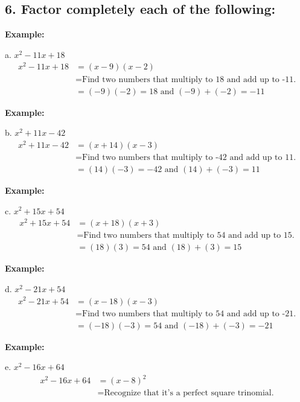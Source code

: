 \documentclass[12pt,a4paper]{article}
\newenvironment{example}
  {\begin{framed}\colorbox{examplecolor}{
  \parbox{\dimexpr\linewidth-2\fboxsep}{
  \textbf{Example:}}}}
  {\end{framed}}
\begin{document}
\subsection*{6. Factor completely each of the following:}

\begin{example}
a. $x^2 - 11x + 18$
\begin{align*}
x^2 - 11x + 18 &= (x - 9)(x - 2) \\
&= \text{Find two numbers that multiply to 18 and add up to -11.} \\
&= (-9)(-2) = 18 \text{ and } (-9) + (-2) = -11
\end{align*}
\end{example}

\begin{example}
b. $x^2 + 11x - 42$
\begin{align*}
x^2 + 11x - 42 &= (x + 14)(x - 3) \\
&= \text{Find two numbers that multiply to -42 and add up to 11.} \\
&= (14)(-3) = -42 \text{ and } (14) + (-3) = 11
\end{align*}
\end{example}

\begin{example}
c. $x^2 + 15x + 54$
\begin{align*}
x^2 + 15x + 54 &= (x + 18)(x + 3) \\
&= \text{Find two numbers that multiply to 54 and add up to 15.} \\
&= (18)(3) = 54 \text{ and } (18) + (3) = 15
\end{align*}
\end{example}

\begin{example}
d. $x^2 - 21x + 54$
\begin{align*}
x^2 - 21x + 54 &= (x - 18)(x - 3) \\
&= \text{Find two numbers that multiply to 54 and add up to -21.} \\
&= (-18)(-3) = 54 \text{ and } (-18) + (-3) = -21
\end{align*}
\end{example}

\begin{example}
e. $x^2 - 16x + 64$
\begin{align*}
x^2 - 16x + 64 &= (x - 8)^2 \\
&= \text{Recognize that it's a perfect square trinomial.}
\end{align*}
\end{example}
\end{document}
